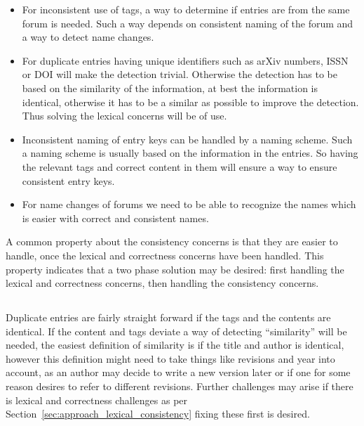 \begin{itemize}
\item For inconsistent use of tags, a way to determine if entries are
  from the same forum is needed.  Such a way depends on consistent
  naming of the forum and a way to detect name changes.

\item For duplicate entries having unique identifiers such as arXiv
  numbers, ISSN or DOI will make the detection trivial.  Otherwise the
  detection has to be based on the similarity of the information, at
  best the information is identical, otherwise it has to be a similar
  as possible to improve the detection.  Thus solving the lexical
  concerns will be of use.

\item Inconsistent naming of entry keys can be handled by a naming
  scheme.  Such a naming scheme is usually based on the information in
  the entries.  So having the relevant tags and correct content in
  them will ensure a way to ensure consistent entry keys.

\item For name changes of forums we need to be able to recognize the
  names which is easier with correct and consistent names.
\end{itemize}

A common property about the consistency concerns is that they are
easier to handle, once the lexical and correctness concerns have been
handled.  This property indicates that a two phase solution may be
desired: first handling the lexical and correctness concerns, then
handling the consistency concerns.


\subsection{}
\label{sec:approach_duplicates}

Duplicate entries are fairly straight forward if the tags and the
contents are identical.  If the content and tags deviate a way of
detecting ``similarity'' will be needed, the easiest definition of
similarity is if the title and author is identical, however this
definition might need to take things like revisions and year into
account, as an author may decide to write a new version later or if
one for some reason desires to refer to different revisions.  Further
challenges may arise if there is lexical and correctness challenges as
per Section~\ref{sec:approach_lexical_consistency} fixing these first
is desired.


